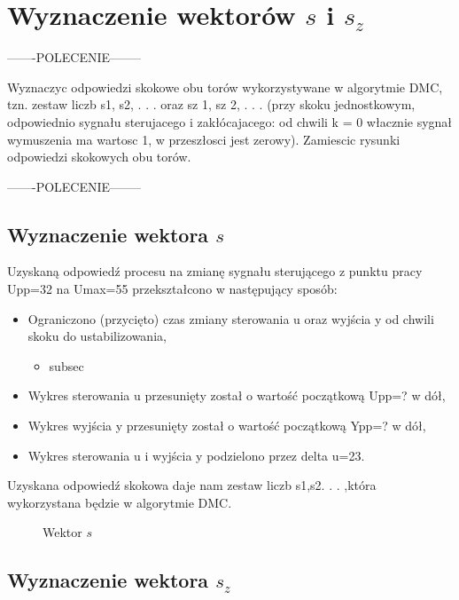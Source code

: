 \section{Wyznaczenie wektorów $s$ i $s_z$ }
\label{projekt:zad3}

-------POLECENIE--------

Wyznaczyc odpowiedzi skokowe obu torów wykorzystywane w algorytmie DMC, tzn.
zestaw liczb s1, s2, . . . oraz sz
1, sz
2, . . . (przy skoku jednostkowym, odpowiednio sygnału
sterujacego i zakłócajacego: od chwili k = 0 włacznie sygnał wymuszenia ma wartosc
1, w przeszłosci jest zerowy). Zamiescic rysunki odpowiedzi skokowych obu torów.

-------POLECENIE--------



\subsection{Wyznaczenie wektora $s$}
\label{projekt:zad3:s}

Uzyskaną odpowiedź procesu na zmianę sygnału sterującego z punktu pracy Upp=32 na
Umax=55 przekształcono w następujący sposób: 
\begin{itemize}
    \item Ograniczono (przycięto) czas zmiany sterowania u oraz wyjścia y od chwili skoku do ustabilizowania, 
    \begin{itemize}
        \item subsec
    \end{itemize}
    \item Wykres sterowania u przesunięty został o wartość początkową Upp=? w dół, 
    \item Wykres wyjścia y przesunięty został o wartość początkową Ypp=? w dół, 
    \item Wykres sterowania u i wyjścia y podzielono przez delta u=23. 
\end{itemize}

Uzyskana odpowiedź skokowa daje nam zestaw liczb s1,s2. . . ,która wykorzystana będzie w algorytmie DMC.

\begin{figure}[H] 
    \centering
    
    \caption{Wektor $s$}
    \label{projekt:zad3:s:figure}
\end{figure}

\subsection{Wyznaczenie wektora $s_z$}
\label{projekt:zad3:sz}

